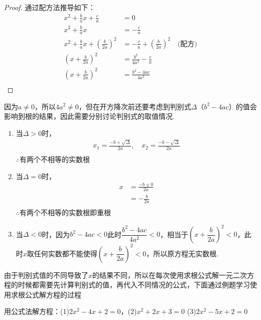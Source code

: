 \documentclass[lang=cn, 10pt, titlestyle=hang, oneside]{elegantbook}
\begin{document}
\begin{proof}
通过配方法推导如下：
\begin{align*}
    x^2 + \frac{b}{a}x + \frac{c}{a} &= 0\\
    x^2 + \frac{b}{a}x &= -\frac{c}{a}\\
    x^2 + \frac{b}{a}x + \left(\frac{b}{2a}\right)^2 &= -\frac{c}{a} + \left(\frac{b}{2a}\right)^2 \quad \text{(配方)} \\
    \left(x + \frac{b}{2a}\right)^2 &= \frac{b^2}{4a^2} - \frac{c}{a}\\
    \left(x + \frac{b}{2a}\right)^2 &= \frac{b^2 - 4ac}{4a^2}\\
\end{align*}
\end{proof}
因为\(a\ne0\)，所以\(4a^2\ne0\)，但在开方降次前还要考虑到判别式\(\Delta\)（\(b^2 - 4ac\)）的值会影响到根的结果，因此需要分别讨论判别式的取值情况.
\begin{enumerate}
    \item 当\(\Delta>0\)时，
    \begin{align*}
        x_1 = \frac{-b + \sqrt{\Delta}}{2a}, \quad x_2 = \frac{-b - \sqrt{\Delta}}{2a}\\
    \end{align*}
    $\therefore \text{有两个不相等的实数根}$
    \item 当\(\Delta=0\)时，
    \begin{align*}
         x &= \frac{-b \pm 0}{2a}\\
    &= -\frac{b}{2a}\\
    \end{align*}
    $\therefore \text{有两个不相等的实数根即重根}$
    \item 当\(\Delta<0\)时，因为\(b^2 - 4ac<0\)此时\(\dfrac{b^2 - 4ac}{4a^2}<0\)，相当于\((x + \dfrac{b}{2a})^2<0\)，此时\(x\)取任何实数都不能使得\((x + \dfrac{b}{2a})^2<0\)，所以原方程无实数根.

\end{enumerate}
\par
由于判别式值的不同导致了\(x\)的结果不同，所以在每次使用求根公式解一元二次方程的时候都需要先计算判别式的值，再代入不同情况的公式，下面通过例题学习使用求根公式解方程的过程
\begin{example}
    用公式法解方程：(1)\( 2x^2 - 4x + 2 = 0 \)，(2)\( x^2 + 2x + 3 = 0 \) (3)\( 2x^2 - 5x + 2 = 0 \)
\end{example}
\end{document}
